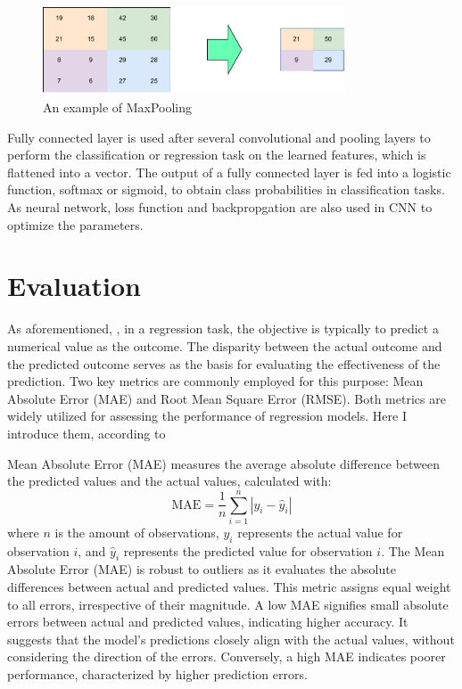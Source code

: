 \documentclass[12pt,a4paper,english
]{tunithesis}
\begin{document}
\begin{figure}
  \begin{center}
    \includegraphics[width=0.8\textwidth]{thesis/img/maxpooling.pdf}
  \end{center}
  \caption[MaxPooling]{An example of MaxPooling}
  \label{fig:maxpooling}
\end{figure}

Fully connected layer is used after several convolutional and pooling layers to perform the classification or regression task on the learned features, which is flattened into a vector. The output of a fully connected layer is fed into a logistic function, softmax or sigmoid, to obtain class probabilities in classification tasks. As neural network, loss function and backpropgation are also used in CNN to optimize the parameters.


\section{Evaluation}
As aforementioned, , in a regression task, the objective is typically to predict a numerical value as the outcome. The disparity between the actual outcome and the predicted outcome serves as the basis for evaluating the effectiveness of the prediction. Two key metrics are commonly employed for this purpose: Mean Absolute Error (MAE) and Root Mean Square Error (RMSE). Both metrics are widely utilized for assessing the performance of regression models. Here I introduce them, according to \textcite{tyagi2022, chai2014}

Mean Absolute Error (MAE) measures the average absolute difference between the predicted values and the actual values, calculated with: 
\begin{equation}
    \mathrm{MAE}=\frac{1}{n} \sum_{i=1}^n\left|y_i-\hat{y}_i\right|
\end{equation}
where $n$ is the amount of observations, $y_i$ represents the actual value for observation $i$, and $\hat{y}_i$ represents the predicted value for observation $i$. The Mean Absolute Error (MAE) is robust to outliers as it evaluates the absolute differences between actual and predicted values. This metric assigns equal weight to all errors, irrespective of their magnitude. A low MAE signifies small absolute errors between actual and predicted values, indicating higher accuracy. It suggests that the model's predictions closely align with the actual values, without considering the direction of the errors. Conversely, a high MAE indicates poorer performance, characterized by higher prediction errors.
\end{document}
